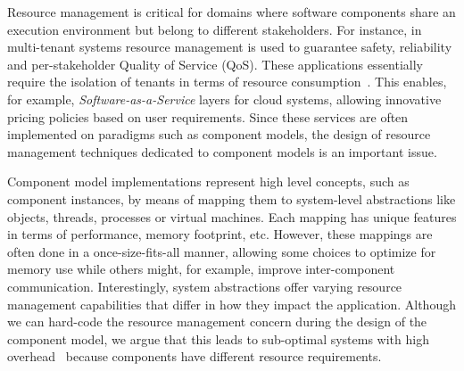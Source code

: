 
Resource management is critical for domains where software components share an execution environment but belong to different stakeholders.
For instance, in multi-tenant systems resource management is used to guarantee safety, reliability and per-stakeholder Quality of Service (QoS).
These applications essentially require the isolation of tenants in terms of resource consumption~\cite{KrWeKo2013-icwe-MTBenchmark}.
This enables, for example, \textit{Software-as-a-Service} layers for cloud systems, allowing innovative pricing policies based on user requirements. %
Since these services are often implemented on paradigms such as component models,
the design of resource management techniques dedicated to component models is an important issue.

Component model implementations represent high level concepts, such as component instances, by means of mapping them to system-level abstractions like objects, threads, processes or virtual machines.
Each mapping has unique features in terms of performance, memory footprint, etc.
However, these mappings are often done in a once-size-fits-all manner, allowing some choices to optimize for memory use while others might, for example, improve inter-component communication.
Interestingly, system abstractions offer varying resource management capabilities that differ in how they impact the application.
Although we can hard-code the resource management concern during the design of the component model, we argue that this leads to sub-optimal systems with high  overhead~\cite{binder_portable_2006,czajkowski_jres:_1998,Maurel:2012:AME:2304736.2304763} because components have different resource requirements.

